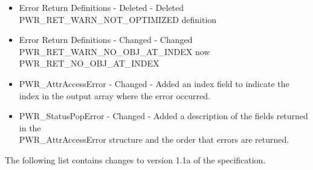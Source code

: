 \begin{itemize}
{    PWR_RET_WARN_NO_CHILDREN, PWR_RET_WARN_NO_PARENT definitions }
    \item{Error Return Definitions - Deleted - Deleted PWR_RET_WARN_NOT_OPTIMIZED definition }
    \item{Error Return Definitions - Changed - Changed PWR_RET_WARN_NO_OBJ_AT_INDEX now PWR_RET_NO_OBJ_AT_INDEX}
    \item{PWR_AttrAccessError - Changed - Added an index field to indicate the index in the output array where the error occurred.}
    \item{PWR_StatusPopError - Changed - Added a description of the fields returned in the \\
    PWR_AttrAccessError structure and the order that errors are returned.}
\end{itemize}


The following list contains changes to version 1.1a of the specification.

